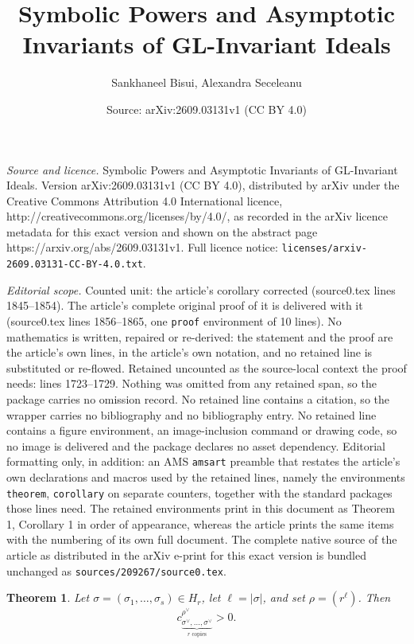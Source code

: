 \documentclass[10pt,a4paper]{amsart}
\title{Symbolic Powers and Asymptotic Invariants of GL-Invariant Ideals}
\author{Sankhaneel Bisui, Alexandra Seceleanu}
\date{Source: arXiv:2609.03131v1 (CC BY 4.0)}
\newtheorem{theorem}{Theorem}
\begin{document}
\maketitle

\noindent\emph{Source and licence.} Symbolic Powers and Asymptotic Invariants of GL-Invariant Ideals. Version arXiv:2609.03131v1 (CC BY 4.0), distributed by arXiv under the Creative Commons Attribution 4.0 International licence, http://creativecommons.org/licenses/by/4.0/, as recorded in the arXiv licence metadata for this exact version and shown on the abstract page https://arxiv.org/abs/2609.03131v1. Full licence notice: \texttt{licenses/arxiv-2609.03131-CC-BY-4.0.txt}.\par\smallskip

\noindent\textit{Editorial scope.} Counted unit: the article's corollary corrected (source0.tex lines 1845--1854). The article's complete original proof of it is delivered with it (source0.tex lines 1856--1865, one \texttt{proof} environment of 10 lines). No mathematics is written, repaired or re-derived: the statement and the proof are the article's own lines, in the article's own notation, and no retained line is substituted or re-flowed.  Retained uncounted as the source-local context the proof needs: lines 1723--1729.  Nothing was omitted from any retained span, so the package carries no omission record.  No retained line contains a citation, so the wrapper carries no bibliography and no bibliography entry.  No retained line contains a figure environment, an image-inclusion command or drawing code, so no image is delivered and the package declares no asset dependency.  Editorial formatting only, in addition: an AMS \texttt{amsart} preamble that restates the article's own declarations and macros used by the retained lines, namely the environments \texttt{theorem}, \texttt{corollary} on separate counters, together with the standard packages those lines need.  The retained environments print in this document as Theorem 1, Corollary 1 in order of appearance, whereas the article prints the same items with the numbering of its own full document.  The complete native source of the article as distributed in the arXiv e-print for this exact version is bundled unchanged as \texttt{sources/209267/source0.tex}.
\begin{theorem}\label{thm: rectangle corrected}
Let $\sigma=(\sigma_1,\ldots,\sigma_s)\in H_r$, let
$\ell=|\sigma|$, and set $\rho=(r^\ell)$.  Then
\[
c_{\underbrace{\scriptstyle\sigma^\vee,\ldots,\sigma^\vee}_{r\text{ copies}}}^{\rho^\vee}>0.
\]
\end{theorem}
\end{document}
